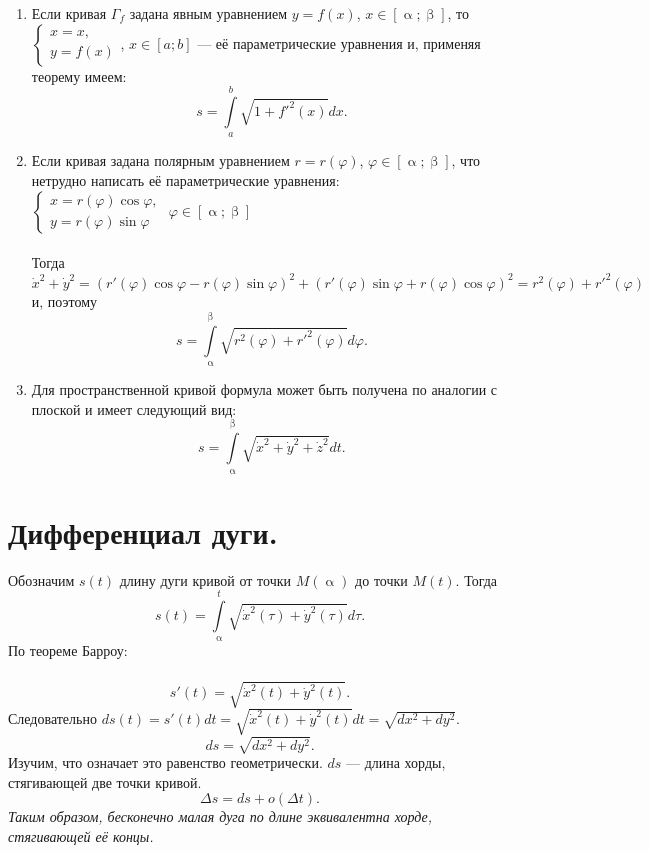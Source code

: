\begin{corollary}
	\begin{enumerate}
		\item
		Если кривая $\Gamma_f$ задана явным уравнением $y=f(x)$, $x\in [\upalpha; \upbeta]$, то $\begin{cases}
			x=x , \\
			y=f(x)
		\end{cases}$, $x\in [a; b]$ --- её параметрические уравнения и, применяя теорему имеем:
		$$s = \int\limits_a^b \sqrt{1 + f'^2(x)}dx.$$
		\item
		Если кривая задана полярным уравнением $r=r(\varphi)$, $\varphi \in [\upalpha;\upbeta]$, что нетрудно написать её параметрические уравнения:\\
		$\begin{cases}
			x= r(\varphi) \cos\varphi, \\
			y= r(\varphi) \sin\varphi
		\end{cases}$ $\varphi \in [\upalpha;\upbeta]$\\\\
		Тогда $\dot x^2 + \dot y^2 = (r'(\varphi)\cos\varphi - r(\varphi)\sin\varphi)^2 + (r'(\varphi)\sin\varphi + r(\varphi)\cos\varphi)^2 = r^2(\varphi) + r'^2(\varphi)$  и, поэтому
		$$s = \int\limits_\upalpha^\upbeta \sqrt{r^2(\varphi) + r'^2(\varphi)}d\varphi.$$
		\item
		Для пространственной кривой формула может быть получена по аналогии с плоской и имеет следующий вид:
		$$s = \int\limits_\upalpha^\upbeta \sqrt{\dot x^2 + \dot y^2 + \dot z^2}dt.$$
	\end{enumerate}
\end{corollary}
\section{Дифференциал дуги.}
Обозначим $s(t)$ длину дуги кривой от точки $M(\upalpha)$ до точки $M(t)$.
Тогда $$s(t) = \int\limits_\upalpha^t\sqrt{\dot x^2(\tau)+ \dot y^2(\tau)}d\tau .$$
По теореме Барроу:\\\\
$$s'(t) = \sqrt{\dot x^2(t)+ \dot y^2(t)}.$$
Следовательно $ds(t) = s'(t)dt = \sqrt{\dot x^2(t)+ \dot y^2(t)}dt = \sqrt{dx^2 + dy^2}$.
$$ds = \sqrt{dx^2 + dy^2}.$$
Изучим, что означает это равенство геометрически. $ds$ --- длина хорды, стягивающей две точки кривой.
$$\Delta s = ds + o(\Delta t).$$
\textit{Таким образом, бесконечно малая дуга по длине эквивалентна хорде, стягивающей её концы.}
